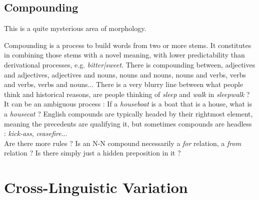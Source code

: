 \documentclass{cours}
\begin{document}
\subsection{Compounding}
This is a quite mysterious area of morphology.

Compounding is a process to build words from two or more stems. It constitutes in combining those stems with a novel meaning, with lower predictability than derivational processes, e.g. \textsl{bitter|sweet}. There is compounding between, adjectives and adjectives, adjectives and nouns, nouns and nouns, nouns and verbs, verbs and verbs, verbs and nouns... There is a very blurry line between what people think and historical reasons, are people thinking of \textsl{sleep} and \textsl{walk} in \textsl{sleepwalk} ?\\
It can be an ambiguous process : If a \textsl{houseboat} is a boat that is a house, what is a \textsl{housecat} ? English compounds are typically headed by their rightmost element, meaning the precedents are qualifying it, but sometimes compounds are headless : \textsl{kick-ass}, \textsl{ceasefire}...\\
Are there more rules ? Is an N-N compound necessarily a \textit{for} relation, a \textit{from} relation ? Is there simply just a hidden preposition in it ? 

\section{Cross-Linguistic Variation}
\end{document}
